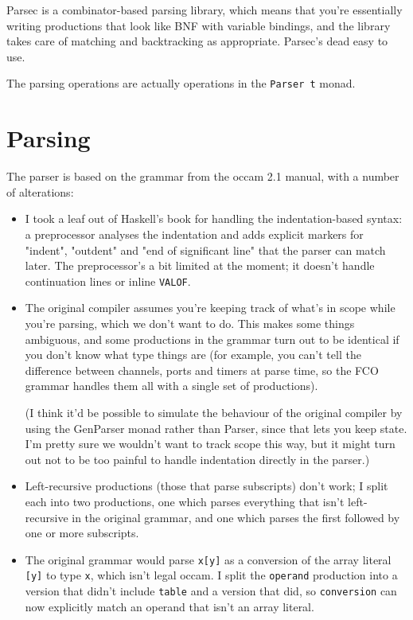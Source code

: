 \documentclass[a4paper,12pt]{article}
\def\occam{{\sffamily occam}\xspace}
\begin{document}
Parsec is a combinator-based parsing library, which means that you're
essentially writing productions that look like BNF with variable
bindings, and the library takes care of matching and backtracking as
appropriate. Parsec's dead easy to use.

The parsing operations are actually operations in the \verb|Parser t|
monad.

\section{Parsing}

The parser is based on the grammar from the \occam 2.1 manual, with a
number of alterations:

\begin{itemize}

\item I took a leaf out of Haskell's book for handling the
indentation-based syntax: a preprocessor analyses the indentation and
adds explicit markers for "indent", "outdent" and "end of significant
line" that the parser can match later. The preprocessor's a bit limited
at the moment; it doesn't handle continuation lines or inline
\verb|VALOF|.

\item The original compiler assumes you're keeping track of what's in
scope while you're parsing, which we don't want to do. This makes some
things ambiguous, and some productions in the grammar turn out to be
identical if you don't know what type things are (for example, you can't
tell the difference between channels, ports and timers at parse time, so
the FCO grammar handles them all with a single set of productions).

(I think it'd be possible to simulate the behaviour of the original
compiler by using the GenParser monad rather than Parser, since that
lets you keep state. I'm pretty sure we wouldn't want to track scope
this way, but it might turn out not to be too painful to handle
indentation directly in the parser.)

\item Left-recursive productions (those that parse subscripts) don't
work; I split each into two productions, one which parses everything
that isn't left-recursive in the original grammar, and one which parses
the first followed by one or more subscripts.

\item The original grammar would parse \verb|x[y]| as a conversion of
the array literal \verb|[y]| to type \verb|x|, which isn't legal \occam.
I split the \verb|operand| production into a version that didn't include
\verb|table| and a version that did, so \verb|conversion| can now
explicitly match an operand that isn't an array literal.


\end{itemize}
\end{document}
